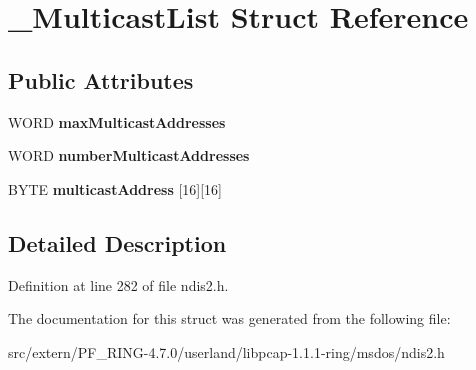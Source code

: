 \hypertarget{struct___multicast_list}{
\section{\_\-MulticastList Struct Reference}
\label{struct___multicast_list}
}
\subsection*{Public Attributes}
\begin{DoxyCompactItemize}
\item 
\hypertarget{struct___multicast_list_abbc898a07f53efa3edb5494081fc3303}{
WORD {\bfseries maxMulticastAddresses}}
\label{struct___multicast_list_abbc898a07f53efa3edb5494081fc3303}

\item 
\hypertarget{struct___multicast_list_a8be367656fae28f8e1a08ac3fec6e0da}{
WORD {\bfseries numberMulticastAddresses}}
\label{struct___multicast_list_a8be367656fae28f8e1a08ac3fec6e0da}

\item 
\hypertarget{struct___multicast_list_af1ea0d080ec1cef82ce669a21b28dd9d}{
BYTE {\bfseries multicastAddress} \mbox{[}16\mbox{]}\mbox{[}16\mbox{]}}
\label{struct___multicast_list_af1ea0d080ec1cef82ce669a21b28dd9d}

\end{DoxyCompactItemize}


\subsection{Detailed Description}


Definition at line 282 of file ndis2.h.



The documentation for this struct was generated from the following file:\begin{DoxyCompactItemize}
\item 
src/extern/PF\_\-RING-\/4.7.0/userland/libpcap-\/1.1.1-\/ring/msdos/ndis2.h\end{DoxyCompactItemize}
